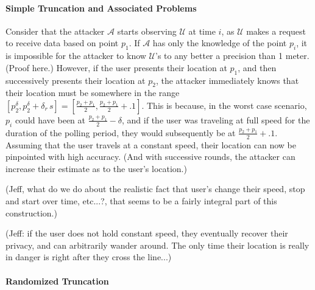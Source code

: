 \documentclass{article}
\begin{document}
\paragraph{Simple Truncation and Associated Problems}

Consider that the attacker $\mathcal{A}$ starts observing
$\mathcal{U}$ at time $i$, as $\mathcal{U}$ makes a request to receive
data based on point $p_1$.  If $\mathcal{A}$ has only the knowledge of
the point $p_i$, it is impossible for the attacker to know
$\mathcal{U}$'s to any better a precision than 1 meter.  (Proof here.)
However, if the user presents their location at $p_1$, and then
successively presents their location at $p_2$, the attacker
immediately knows that their location must be somewhere in the range
$[p_2^{\delta},p_2^{\delta} + \delta_r\, s] = [\frac{p_2 + p_1}{2},
\frac{p_2 + p_1}{2} + .1]$.  This is because, in the worst case
scenario, $p_i$ could have been at $\frac{p_2 + p_1}{2} - \delta$, and
if the user was traveling at full speed for the duration of the
polling period, they would subsequently be at $\frac{p_2 + p_1}{2} +
.1$.  Assuming that the user travels at a constant speed, their
location can now be pinpointed with high accuracy.  (And with
successive rounds, the attacker can increase their estimate as to the
user's location.)

(Jeff, what do we do about the realistic fact that user's change their
speed, stop and start over time, etc...?, that seems to be a fairly
integral part of this construction.)

(Jeff: if the user does not hold constant speed, they eventually
recover their privacy, and can arbitrarily wander around.  The only
time their location is really in danger is right after they cross the
line...)

\paragraph{Randomized Truncation}
\end{document}
